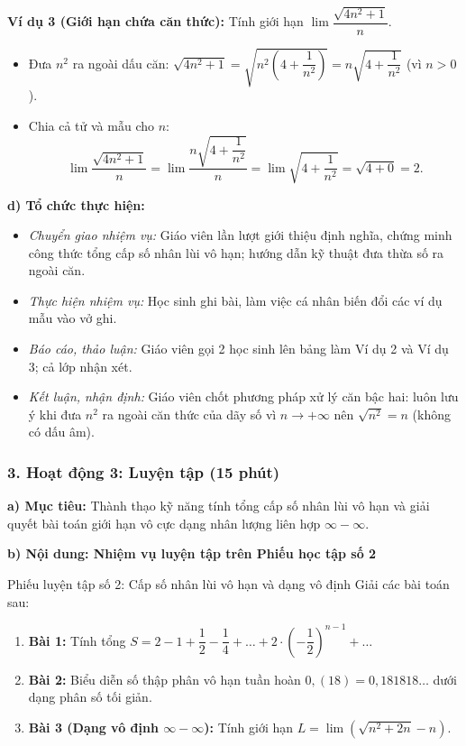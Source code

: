 \documentclass[12pt, a4paper]{article}
\begin{document}
\textbf{Ví dụ 3 (Giới hạn chứa căn thức):} Tính giới hạn $\lim \dfrac{\sqrt{4n^2 + 1}}{n}$.
\begin{itemize}[leftmargin=0.6cm]
    \item Đưa $n^2$ ra ngoài dấu căn: $\sqrt{4n^2 + 1} = \sqrt{n^2\left(4 + \dfrac{1}{n^2}\right)} = n\sqrt{4 + \dfrac{1}{n^2}}$ (vì $n > 0$).
    \item Chia cả tử và mẫu cho $n$:
    $$\lim \dfrac{\sqrt{4n^2 + 1}}{n} = \lim \dfrac{n\sqrt{4 + \dfrac{1}{n^2}}}{n} = \lim \sqrt{4 + \dfrac{1}{n^2}} = \sqrt{4 + 0} = 2.$$
\end{itemize}

\noindent \textbf{d) Tổ chức thực hiện:}
\begin{itemize}[leftmargin=0.8cm]
    \item \textit{Chuyển giao nhiệm vụ:} Giáo viên lần lượt giới thiệu định nghĩa, chứng minh công thức tổng cấp số nhân lùi vô hạn; hướng dẫn kỹ thuật đưa thừa số ra ngoài căn.
    \item \textit{Thực hiện nhiệm vụ:} Học sinh ghi bài, làm việc cá nhân biến đổi các ví dụ mẫu vào vở ghi.
    \item \textit{Báo cáo, thảo luận:} Giáo viên gọi 2 học sinh lên bảng làm Ví dụ 2 và Ví dụ 3; cả lớp nhận xét.
    \item \textit{Kết luận, nhận định:} Giáo viên chốt phương pháp xử lý căn bậc hai: luôn lưu ý khi đưa $n^2$ ra ngoài căn thức của dãy số vì $n \to +\infty$ nên $\sqrt{n^2} = n$ (không có dấu âm).
\end{itemize}

\subsubsection*{3. Hoạt động 3: Luyện tập (15 phút)}

\noindent \textbf{a) Mục tiêu:}
Thành thạo kỹ năng tính tổng cấp số nhân lùi vô hạn và giải quyết bài toán giới hạn vô cực dạng nhân lượng liên hợp $\infty - \infty$.

\noindent \textbf{b) Nội dung: Nhiệm vụ luyện tập trên Phiếu học tập số 2}
\begin{pedabox}{Phiếu luyện tập số 2: Cấp số nhân lùi vô hạn và dạng vô định}
Giải các bài toán sau:
\begin{enumerate}[leftmargin=0.6cm]
    \item \textbf{Bài 1:} Tính tổng $S = 2 - 1 + \dfrac{1}{2} - \dfrac{1}{4} + \dots + 2 \cdot \left(-\dfrac{1}{2}\right)^{n-1} + \dots$
    \item \textbf{Bài 2:} Biểu diễn số thập phân vô hạn tuần hoàn $0{,}(18) = 0{,}181818\dots$ dưới dạng phân số tối giản.
    \item \textbf{Bài 3 (Dạng vô định $\infty - \infty$):} Tính giới hạn $L = \lim \left(\sqrt{n^2 + 2n} - n\right)$.
\end{enumerate}
\end{pedabox}
\end{document}
